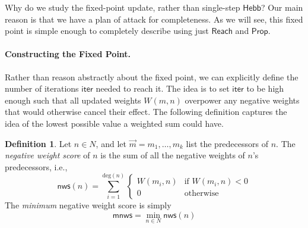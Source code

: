 \documentclass[letterpaper]{article}
\theoremstyle{definition}
\newtheorem{definition}{Definition}
\newtheorem{proposition}{Proposition}
\newcommand{\key}[1]{\emph{#1}}
\newcommand{\State}{\mathsf{State}}
\newcommand*{\bigchi}{\mbox{\Large$\chi$}}%
\newcommand{\degree}[1]{\mathrm{deg}(#1)}
\newcommand{\negweightscore}[1]{\mathsf{nws}(#1)}
\newcommand{\minscore}{\mathsf{mnws}}
\newcommand{\numiterations}{\mathsf{iter}}
\newcommand{\Prop}{\mathsf{Prop}}
\newcommand{\Reach}{\mathsf{Reach}}
\newcommand{\HebbNoArgs}{\mathsf{Hebb}}
\begin{document}
Why do we study the fixed-point update, rather than single-step $\HebbNoArgs$?  Our main reason is that we have a plan of attack for completeness.  As we will see, this fixed point is simple enough to completely describe using just $\Reach$ and $\Prop$.  







\paragraph*{Constructing the Fixed Point.}
Rather than reason abstractly about the fixed point, we can explicitly define the number of iterations $\numiterations$ needed to reach it.  The idea is to set $\numiterations$ to be high enough such that all updated weights $W(m, n)$ overpower any negative weights that would otherwise cancel their effect.  The following definition captures the idea of the lowest possible value a weighted sum could have.
\begin{definition}
    Let $n \in N$, and let $\vec{m} = m_1, \ldots, m_k$ list the predecessors of $n$. The \key{negative weight score} of $n$ is the sum of all the negative weights of $n$'s predecessors, i.e.,
    \[
        \negweightscore{n} = \sum_{i=1}^{\degree{n}} 
        \begin{cases}
            W(m_i, n) & \textrm{if } W(m_i, n) < 0\\
            0 & \textrm{otherwise}
        \end{cases}
    \]
    The \key{minimum} negative weight score is simply
    \[
        \minscore = \min_{n \in N} \negweightscore{n}
    \]
\end{definition}

\end{document}
